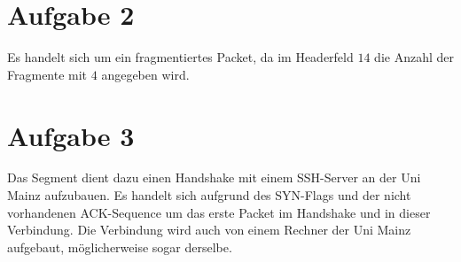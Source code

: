 \section{Aufgabe 2}
Es handelt sich um ein fragmentiertes Packet, da im Headerfeld $14$ die Anzahl der Fragmente mit $4$ angegeben wird.

\section{Aufgabe 3}
Das Segment dient dazu einen Handshake mit einem SSH-Server an der Uni Mainz aufzubauen. Es handelt sich aufgrund des SYN-Flags und der nicht vorhandenen ACK-Sequence um das erste Packet im Handshake und in dieser Verbindung. Die Verbindung wird auch von einem Rechner der Uni Mainz aufgebaut, möglicherweise sogar derselbe.
